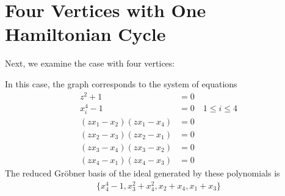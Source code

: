 \documentclass[letterpaper]{article}
\newcommand{\aln}[1]{\begin{align*} #1 \end{align*}} %
\begin{document}
\section{Four Vertices with One Hamiltonian Cycle}
Next, we examine the case with four vertices:
\begin{center}
\end{center}
In this case, the graph corresponds to the system of equations
\aln{
  z^2 + 1 &= 0\\
  x_i^4 - 1 &= 0 \quad 1 \leq i \leq 4\\
  (z x_1 - x_2) (z x_1 - x_4) &= 0\\
  (z x_2 - x_3) (z x_2 - x_1) &= 0\\
  (z x_3 - x_4) (z x_3 - x_2) &= 0\\
  (z x_4 - x_1) (z x_4 - x_3) &= 0
}
The reduced Gr\"obner basis of the ideal generated by these polynomials is
\aln{
  \{x_4^4-1, x_3^2+x_4^2, x_2+x_4, x_1+x_3\}
}

\newpage
\end{document}
